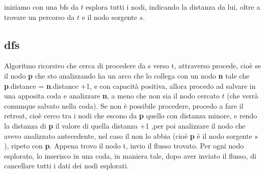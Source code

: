 \documentclass{article}
\begin{document}
iniziamo con una bfs da $t$ esplora tutti i nodi, indicando la distanza da lui, oltre a trovare un percorso da $t$ e il nodo sorgente $s$.

\subsection{dfs}

Algoritmo ricorsivo che cerca di procedere da s verso t, attraverso procede, cioè se il nodo \textbf{p} che sto analizzando ha un arco che lo collega con un nodo \textbf{n} tale che \textbf{p}.distance = \textbf{n}.distance +1, e con capacità positiva, allora procedo ad salvare in una apposita coda e analizzare \textbf{n},  a meno che non sia  il nodo cercato $t$ (che verrà comunque salvato nella coda).
Se non è possibile procedere, procedo a fare il retreat, cioè cerco tra i nodi che escono da \textbf{p} quello con distanza minore, e rendo la distanza di \textbf{p} il valore di quella distanza +1 ,per poi analizzare il nodo che avevo analizzato antecedente, nel caso il non lo abbia (cioè \textbf{p} è il nodo sorgente $s$), ripeto con \textbf{p}.
Appena trovo il nodo t, invio il flusso trovato.
Per ogni nodo esplorato, lo inserisco in una coda, in maniera tale, dopo aver inviato il flusso, di cancellare tutti i dati dei nodi esplorati.
\end{document}
